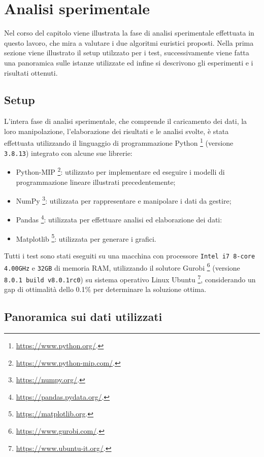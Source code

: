 \chapter{Analisi sperimentale}
\label{cap:analisi-sperimentale}

Nel corso del capitolo viene illustrata la fase di analisi sperimentale effettuata in questo lavoro, che mira a valutare i due algoritmi euristici proposti. Nella prima sezione viene illustrato il setup utilzzato per i test, successivamente viene fatta una panoramica sulle istanze utilizzate ed infine si descrivono gli esperimenti e i risultati ottenuti.


%
%
\section{Setup}
\label{sec:setup}

L'intera fase di analisi sperimentale, che comprende il caricamento dei dati, la loro manipolazione, l'elaborazione dei risultati e le analisi svolte, è stata effettuata utilizzando il linguaggio di programmazione Python \footnote{\url{https://www.python.org/}.} (versione \texttt{3.8.13}) integrato con alcune sue librerie:
\begin{itemize}
    \item Python-MIP \footnote{\url{https://www.python-mip.com/}.}: utilizzato per implementare ed eseguire i modelli di programmazione lineare illustrati precedentemente;
    \item NumPy \footnote{\url{https://numpy.org/}.}: utilizzata per rappresentare e manipolare i dati da gestire;
    \item Pandas \footnote{\url{https://pandas.pydata.org/}.}: utilizzata per effettuare analisi ed elaborazione dei dati:
    \item Matplotlib \footnote{\url{https://matplotlib.org}.}: utilizzata per generare i grafici.
\end{itemize}
Tutti i test sono stati eseguiti su una macchina con processore \texttt{Intel i7 8-core 4.00GHz} e \texttt{32GB} di memoria RAM, utilizzando il solutore Gurobi \footnote{\url{https://www.gurobi.com/}.} (versione \texttt{8.0.1 build v8.0.1rc0}) su sistema operativo Linux Ubuntu \footnote{\url{https://www.ubuntu-it.org/}.}, considerando un gap di ottimalità dello 0.1\% per determinare la soluzione ottima.


\section{Panoramica sui dati utilizzati}

